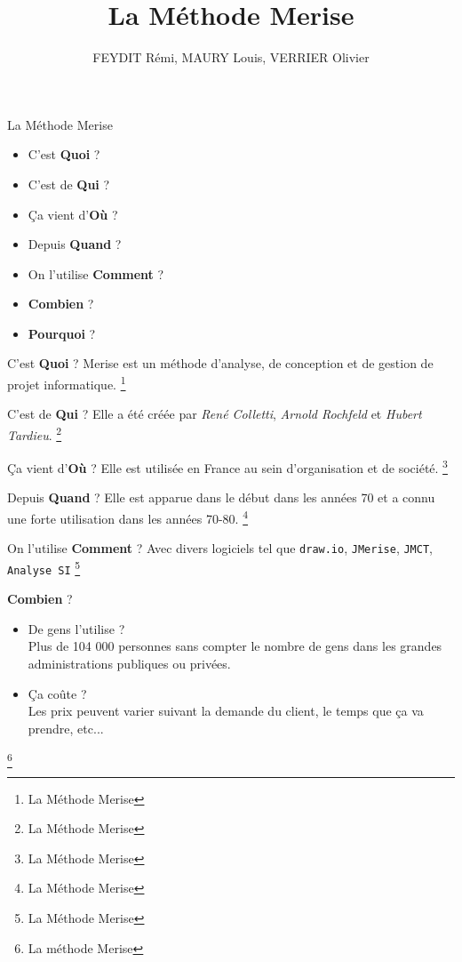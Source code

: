 \documentclass{beamer}
\begin{document}
\begin{frame} %
\title{La Méthode Merise}
\author{FEYDIT Rémi, MAURY Louis, VERRIER Olivier}
\titlepage
\end{frame}

\begin{frame}{La Méthode Merise} %

\begin{itemize}
\item C'est \textbf{Quoi} ?
\item C'est de \textbf{Qui} ?
\item Ça vient d'\textbf{Où} ?
\item Depuis \textbf{Quand} ?
\item On l'utilise \textbf{Comment} ?
\item \textbf{Combien} ?
\item \textbf{Pourquoi} ?
\end{itemize}
\end{frame}

\begin{frame}{C'est \textbf{Quoi} ?}
Merise est un méthode d’analyse, de conception et de gestion de projet informatique.
\footnote{La Méthode Merise}
\end{frame}

\begin{frame}{C'est de \textbf{Qui} ?}
Elle a été créée par \textsl{René Colletti}, \textsl{Arnold Rochfeld} et \textsl{Hubert Tardieu}.
\footnote{La Méthode Merise}
\end{frame}

\begin{frame}{Ça vient d'\textbf{Où} ?}
Elle est utilisée en France au sein d’organisation et de société.
\footnote{La Méthode Merise}
\end{frame}

\begin{frame}{Depuis \textbf{Quand} ?}
Elle est apparue dans le début dans les années 70 et a connu une forte utilisation dans les années 70-80.
\footnote{La Méthode Merise}
\end{frame}

\begin{frame}{On l'utilise \textbf{Comment} ?}
Avec divers logiciels tel que \texttt{draw.io}, \texttt{JMerise}, \texttt{JMCT}, \texttt{Analyse SI}
\footnote{La Méthode Merise}
\end{frame}

\begin{frame}{\textbf{Combien} ?}
\begin{itemize}
\item De gens l'utilise ?\\
Plus de 104 000 personnes sans compter le nombre de gens dans les grandes administrations publiques ou privées.
\item Ça coûte ?\\
Les prix peuvent varier suivant la demande du client, le temps que ça va prendre, etc...
\end{itemize}
\footnote{La méthode Merise}
\end{frame}
\end{document}

